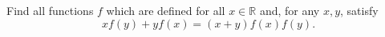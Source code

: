 Find all functions $f$ which are defined for all $x \in \mathbb{R}$ and, for any $x, y$, satisfy
\[ xf(y) + yf(x) = (x + y)f(x)f(y). \]

